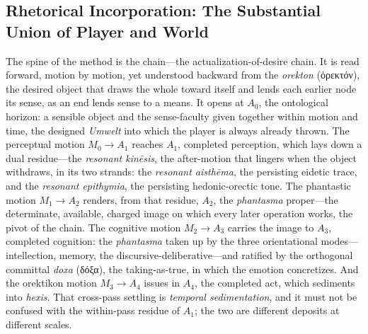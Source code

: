 \documentclass{article}
\newcommand{\gk}[1]{{\greekfont #1}}
\begin{document}
\subsection{Rhetorical Incorporation: The Substantial Union of Player and World}

The spine of the method is the chain---the actualization-of-desire chain. It is read forward, motion by motion, yet understood backward from the \textit{orekton} (\gk{ὀρεκτόν}), the desired object that draws the whole toward itself and lends each earlier node its sense, as an end lends sense to a means. It opens at $A_0$, the ontological horizon: a sensible object and the sense-faculty given together within motion and time, the designed \textit{Umwelt} into which the player is always already thrown. The perceptual motion $M_0 \rightarrow A_1$ reaches $A_1$, completed perception, which lays down a dual residue---the \textit{resonant kinēsis}, the after-motion that lingers when the object withdraws, in its two strands: the \textit{resonant aisthēma}, the persisting eidetic trace, and the \textit{resonant epithymia}, the persisting hedonic-orectic tone. The phantastic motion $M_1 \rightarrow A_2$ renders, from that residue, $A_2$, the \textit{phantasma} proper---the determinate, available, charged image on which every later operation works, the pivot of the chain. The cognitive motion $M_2 \rightarrow A_3$ carries the image to $A_3$, completed cognition: the \textit{phantasma} taken up by the three orientational modes---intellection, memory, the discursive-deliberative---and ratified by the orthogonal committal \textit{doxa} (\gk{δόξα}), the taking-as-true, in which the emotion concretizes. And the orektikon motion $M_3 \rightarrow A_4$ issues in $A_4$, the completed act, which sediments into \textit{hexis}. That cross-pass settling is \textit{temporal sedimentation}, and it must not be confused with the within-pass residue of $A_1$; the two are different deposits at different scales.
\end{document}
